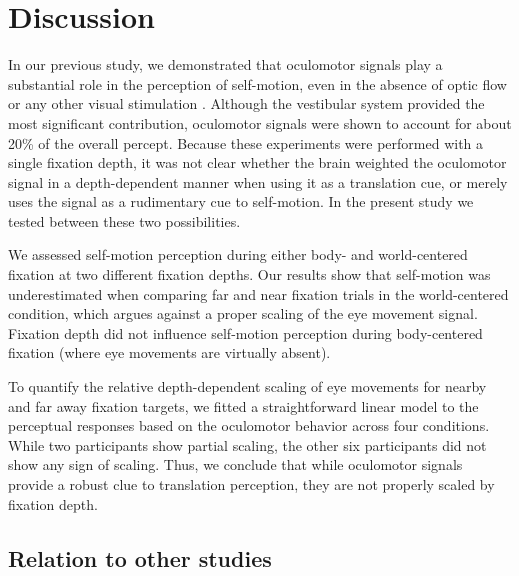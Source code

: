 \section{Discussion}

In our previous study, we demonstrated that oculomotor signals play a substantial role in the perception of self-motion, even in the absence of optic flow or any other visual stimulation \cite{clemens2015a}. Although the vestibular system provided the most significant contribution, oculomotor signals were shown to account for about 20\% of the overall percept. Because these experiments were performed with a single fixation depth, it was not clear whether the brain weighted the oculomotor signal in a depth-dependent manner when using it as a translation cue, or merely uses the signal as a rudimentary cue to self-motion. In the present study we tested between these two possibilities.

We assessed self-motion perception during either body- and world-centered fixation at two different fixation depths. Our results show that self-motion was underestimated when comparing far and near fixation trials in the world-centered condition, which argues against a proper scaling of the eye movement signal. Fixation depth did not influence self-motion perception during body-centered fixation (where eye movements are virtually absent).  

To quantify the relative depth-dependent scaling of eye movements for nearby and far away fixation targets, we fitted a straightforward linear model to the perceptual responses based on the oculomotor behavior across four conditions. While two participants show partial scaling, the other six participants did not show any sign of scaling. Thus, we conclude that while oculomotor signals provide a robust clue to translation perception, they are not properly scaled by fixation depth.


\subsection{Relation to other studies}

